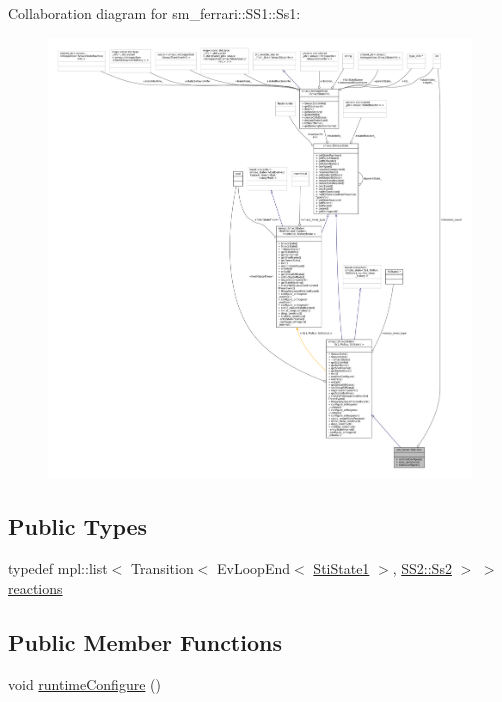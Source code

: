 Collaboration diagram for sm\+\_\+ferrari\+:\+:S\+S1\+:\+:Ss1\+:
\nopagebreak
\begin{figure}[H]
\begin{center}
\leavevmode
\includegraphics[width=350pt]{structsm__ferrari_1_1SS1_1_1Ss1__coll__graph}
\end{center}
\end{figure}
\subsection*{Public Types}
\begin{DoxyCompactItemize}
\item 
typedef mpl\+::list$<$ Transition$<$ Ev\+Loop\+End$<$ \hyperlink{structsm__ferrari_1_1inner__states_1_1StiState1}{Sti\+State1} $>$, \hyperlink{structsm__ferrari_1_1SS2_1_1Ss2}{S\+S2\+::\+Ss2} $>$ $>$ \hyperlink{structsm__ferrari_1_1SS1_1_1Ss1_a389c14039be3368c32e5da394ef48177}{reactions}
\end{DoxyCompactItemize}
\subsection*{Public Member Functions}
\begin{DoxyCompactItemize}
\item 
void \hyperlink{structsm__ferrari_1_1SS1_1_1Ss1_a07e212cc9610cf840dcb36016a3678b7}{runtime\+Configure} ()
\end{DoxyCompactItemize}
